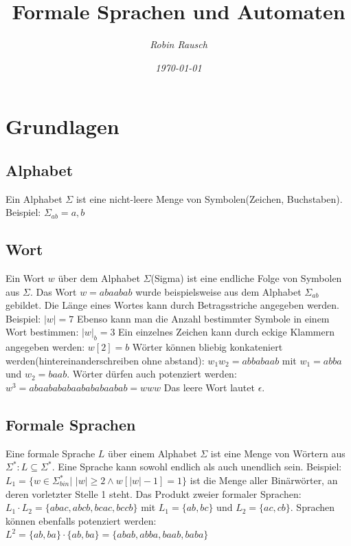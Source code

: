 \documentclass[12pt,a4paper]{article}
\title{Formale Sprachen und Automaten}
\author{\slshape Robin Rausch}
\date{\slshape \today}
\begin{document}
\maketitle
\tableofcontents
\newpage
{}
\section{Grundlagen}
\subsection{Alphabet}
Ein Alphabet $\varSigma$ ist eine nicht-leere Menge von Symbolen(Zeichen, Buchstaben).
Beispiel: $\varSigma_{ab} = { a, b }$

\subsection{Wort}
Ein Wort $w$ über dem Alphabet $\varSigma$(Sigma) ist eine endliche Folge von Symbolen aus $\varSigma$. Das Wort $w = abaabab$ wurde beispielsweise aus dem Alphabet $\varSigma_{ab}$ gebildet.\newline
Die Länge eines Wortes kann durch Betragsstriche angegeben werden. Beispiel: $|w| = 7$\newline
Ebenso kann man die Anzahl bestimmter Symbole in einem Wort bestimmen: $|w|_b = 3$\newline
Ein einzelnes Zeichen kann durch eckige Klammern angegeben werden: $w[2] = b$\newline
Wörter können bliebig konkateniert werden(hintereinanderschreiben ohne abstand): $w_1w_2 = abbabaab$ mit $w_1 = abba$ und $w_2 = baab$.\newline
Wörter dürfen auch potenziert werden: $w^3 = abaabababaabababaabab = www$\newline
Das leere Wort lautet $\epsilon$.

\subsection{Formale Sprachen}
Eine formale Sprache $L$ über einem Alphabet $\varSigma$ ist eine Menge von Wörtern aus $\varSigma^*: L \subseteq \varSigma^*$. Eine Sprache kann sowohl endlich als auch unendlich sein.\newline
Beispiel: $L_1 = \{w \in \varSigma_{bin}^* |$ $|w| \geqslant 2 \wedge w[|w| - 1] = 1\}$ ist die Menge aller Binärwörter, an deren vorletzter Stelle 1 steht.\newline
Das Produkt zweier formaler Sprachen: $L_1 \cdot L_2 = \{abac, abcb, bcac, bccb\}$ mit $L_1 = \{ab, bc\}$ und $L_2 = \{ ac, cb\}$.\newline
Sprachen können ebenfalls potenziert werden: $L^2 = \{ab, ba\} \cdot \{ab, ba\} = \{ abab, abba, baab, baba\}$
\end{document}
